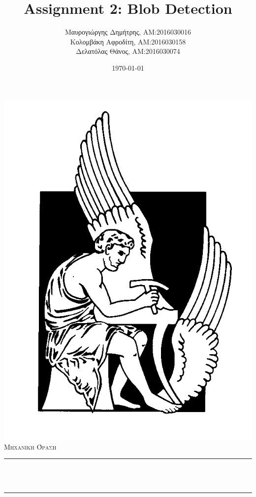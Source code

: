 \documentclass{article}
\newcommand{\tl}[1]{\textlatin{#1}}
\begin{document}
	\greektext
	\title{\tl{Assignment 2: Blob Detection}}						%
	\author{Μαυρογιώργης Δημήτρης, AM:2016030016\\Κολομβάκη Αφροδίτη, AM:2016030158\\Δελατόλας Θάνος, AM:2016030074}								%
	\date{\today}											%
	
	\makeatletter
	\let\thetitle\@title
	\let\theauthor\@author
	\let\thedate\@date
	\makeatother
	
	
	
	\begin{titlepage}
		\centering
		\vspace*{0.5 cm}
		\includegraphics[scale = 0.4]{../../Assignment 1/report/polytexneio-logo.png}\\[1.0 cm]	%
		\textsc{\LARGE Μηχανικη Όραση }\\[2.0 cm]	
		\rule{\linewidth}{0.2 mm} \\[0.4 cm]
		{ \huge \bfseries \thetitle}\\
		\rule{\linewidth}{0.2 mm} \\[1.5 cm]
		

\end{titlepage}
\end{document}
